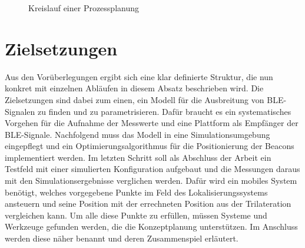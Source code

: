 \begin{figure}[H]
\centering
{}
\caption{Kreislauf einer Prozessplanung}
\label{fig:Prozessplanung}
\end{figure}
\section{Zielsetzungen}
Aus den Vorüberlegungen ergibt sich eine klar definierte Struktur, die nun konkret mit einzelnen Abläufen in diesem Absatz beschrieben wird. Die Zielsetzungen sind dabei zum einen, ein Modell für die Ausbreitung von BLE-Signalen zu finden und zu parametrisieren. Dafür braucht es ein systematisches Vorgehen für die Aufnahme der Messwerte und eine Plattform als Empfänger der BLE-Signale. Nachfolgend muss das Modell in eine Simulationsumgebung eingepflegt und ein Optimierungsalgorithmus für die Positionierung der Beacons implementiert werden. Im letzten Schritt soll als Abschluss der Arbeit ein Testfeld mit einer simulierten Konfiguration aufgebaut und die Messungen daraus mit den Simulationsergebnisse verglichen werden. Dafür wird ein mobiles System benötigt, welches vorgegebene Punkte im Feld des Lokalisierungssystems ansteuern und seine Position mit der errechneten Position aus der Trilateration vergleichen kann. Um alle diese Punkte zu erfüllen, müssen Systeme und Werkzeuge gefunden werden, die die Konzeptplanung unterstützen. Im Anschluss werden diese näher benannt und deren Zusammenspiel erläutert.

